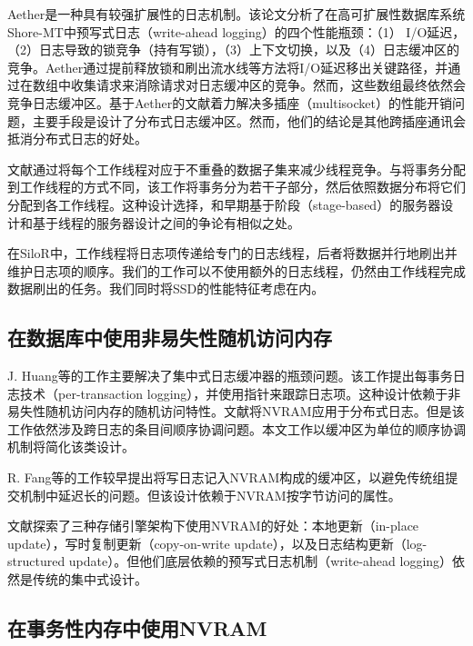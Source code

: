 Aether\cite{Johnson:2010:ASA:1920841.1920928}是一种具有较强扩展性的日志机制。该论文分析了在高可扩展性数据库系统Shore-MT中预写式日志（write-ahead logging）的四个性能瓶颈：（1） I/O延迟，（2）日志导致的锁竞争（持有写锁），（3）上下文切换，以及（4）日志缓冲区的竞争。Aether通过提前释放锁和刷出流水线等方法将I/O延迟移出关键路径，并通过在数组中收集请求来消除请求对日志缓冲区的竞争。然而，这些数组最终依然会竞争日志缓冲区。基于Aether的文献\cite{raey}着力解决多插座（multisocket）的性能开销问题，主要手段是设计了分布式日志缓冲区。然而，他们的结论是其他跨插座通讯会抵消分布式日志的好处。

文献\cite{Pandis:2010:DTE:1920841.1920959}通过将每个工作线程对应于不重叠的数据子集来减少线程竞争。与将事务分配到工作线程的方式不同，该工作将事务分为若干子部分，然后依照数据分布将它们分配到各工作线程。这种设计选择，和早期基于阶段（stage-based）的服务器设计\cite{Welsh:2001:SAW:502034.502057}和基于线程的服务器设计\cite{vonBehren:2003:CST:945445.945471}之间的争论有相似之处。

在SiloR\cite{Zheng:2014:FDF:2685048.2685085}中，工作线程将日志项传递给专门的日志线程，后者将数据并行地刷出并维护日志项的顺序。我们的工作可以不使用额外的日志线程，仍然由工作线程完成数据刷出的任务。我们同时将SSD的性能特征考虑在内。

\subsection{在数据库中使用非易失性随机访问内存}

J. Huang等的工作\cite{Huang:2014:NLT:2735496.2735502}主要解决了集中式日志缓冲器的瓶颈问题。该工作提出每事务日志技术（per-transaction logging），并使用指针来跟踪日志项。这种设计依赖于非易失性随机访问内存的随机访问特性。文献\cite{Wang:2014:SLT:2732951.2732960}将NVRAM应用于分布式日志。但是该工作依然涉及跨日志的条目间顺序协调问题。本文工作以缓冲区为单位的顺序协调机制将简化该类设计。

R. Fang等的工作\cite{5767918}较早提出将写日志记入NVRAM构成的缓冲区，以避免传统组提交机制中延迟长的问题。但该设计依赖于NVRAM按字节访问的属性。

文献\cite{Arulraj:2015:LTS:2723372.2749441}探索了三种存储引擎架构下使用NVRAM的好处：本地更新（in-place update），写时复制更新（copy-on-write update），以及日志结构更新（log-structured update）。但他们底层依赖的预写式日志机制（write-ahead logging）依然是传统的集中式设计。

\subsection{在事务性内存中使用NVRAM}

